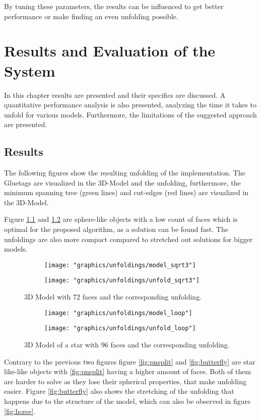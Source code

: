 \documentclass[draft,final]{vutinfth} %
\begin{document}
By tuning these parameters, the results can be influenced to get better performance or make finding an even unfolding possible.

\chapter{Results and Evaluation of the System}
\label{chap:reseval}
In this chapter results are presented and their specifics are discussed. A quantitative performance analysis is also presented, analyzing the time it takes to unfold for various models. Furthermore, the limitations of the suggested approach are presented.

\section{Results}
The following figures show the resulting unfolding of the implementation. The Gluetags are visualized in the 3D-Model and the unfolding, furthermore, the minimum spanning tree (green lines) and cut-edges (red lines) are visualized in the 3D-Model.

Figure \ref{fig:sqrt3} and \ref{fig:loop} are sphere-like objects with a low count of faces which is optimal for the proposed algorithm, as a solution can be found fast. The unfoldings are also more compact compared to stretched out solutions for bigger models.

\begin{figure}
  \begin{subfigure}[b]{0.5\textwidth}
    \texttt{[image: "graphics/unfoldings/model\_sqrt3"]}
  \end{subfigure}
  \begin{subfigure}[b]{0.5\textwidth}
    \texttt{[image: "graphics/unfoldings/unfold\_sqrt3"]}
  \end{subfigure}
  
  \caption{3D Model with 72 faces and the corresponding unfolding.}
  \label{fig:sqrt3}
\end{figure}

\begin{figure}
  \begin{subfigure}[b]{0.5\textwidth}
    \texttt{[image: "graphics/unfoldings/model\_loop"]}
  \end{subfigure}
  \begin{subfigure}[b]{0.5\textwidth}
    \texttt{[image: "graphics/unfoldings/unfold\_loop"]}
  \end{subfigure}
  
  \caption{3D Model of a star with 96 faces and the corresponding unfolding.}
  \label{fig:loop}
\end{figure}
Contrary to the previous two figures figure \ref{fig:pnsplit} and \ref{fig:butterfly} are star like-like objects with \ref{fig:pnsplit} having a higher amount of faces. Both of them are harder to solve as they lose their spherical properties, that make unfolding easier. Figure \ref{fig:butterfly} also shows the stretching of the unfolding that happens due to the structure of the model, which can also be observed in figure \ref{fig:horse}.
\end{document}
